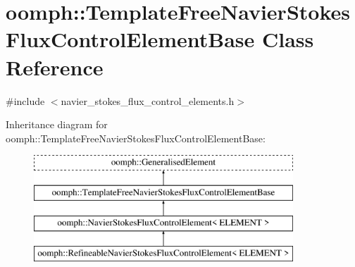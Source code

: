 \hypertarget{classoomph_1_1TemplateFreeNavierStokesFluxControlElementBase}{}\section{oomph\+:\+:Template\+Free\+Navier\+Stokes\+Flux\+Control\+Element\+Base Class Reference}
\label{classoomph_1_1TemplateFreeNavierStokesFluxControlElementBase}


{\ttfamily \#include $<$navier\+\_\+stokes\+\_\+flux\+\_\+control\+\_\+elements.\+h$>$}

Inheritance diagram for oomph\+:\+:Template\+Free\+Navier\+Stokes\+Flux\+Control\+Element\+Base\+:\begin{figure}[H]
\begin{center}
\leavevmode
\includegraphics[height=4.000000cm]{classoomph_1_1TemplateFreeNavierStokesFluxControlElementBase}
\end{center}
\end{figure}
